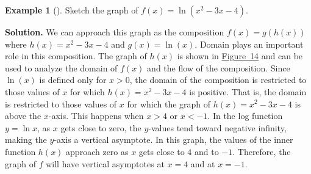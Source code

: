 \documentclass[10pt,]{book}
\theoremstyle{plain}
\theoremstyle{definition}
\theoremstyle{definition}
\newtheorem{example}[theorem]{Example}
\theoremstyle{definition}
\numberwithin{equation}{section}
\newcommand{\lt}{<}
\newcommand{\gt}{>}
\begin{document}
\begin{example}[]\label{example-28}
\hypertarget{p-353}{}%
Sketch the graph of \(f(x) = \ln \left( x^2 - 3x - 4 \right)\).%
\par\smallskip%
\noindent\textbf{Solution.}\hypertarget{solution-28}{}\quad%
\hypertarget{p-354}{}%
We can approach this graph as the composition \(f(x) = g \left( h(x) \right)\) where \(h(x) = x^2 - 3x - 4\) and \(g(x) = \ln (x)\).  Domain plays an important role in this composition. The graph of \(h(x)\) is shown in \hyperref[log-composition-just-quad]{Figure~14} and can be used to analyze the domain of \(f(x)\) and the flow of the composition. Since \(\ln (x)\) is defined only for \(x \gt 0\), the domain of the composition is restricted to those values of \(x\) for which \(h(x) = x^2 -3x - 4\) is positive. That is, the domain is restricted to those values of \(x\) for which the graph of \(h(x) = x^2 -3x -4\) is above the \(x\)-axis. This happens when \(x \gt 4\) or \(x \lt -1\). In the log function \(y = \ln x\), as \(x\) gets close to zero, the \(y\)-values tend toward negative infinity, making the \(y\)-axis a vertical asymptote.  In this graph, the values of the inner function \(h(x)\) approach zero as \(x\) gets close to \(4\) and to \(-1\).  Therefore, the graph of \(f\) will have vertical asymptotes at \(x = 4\) and at \(x = -1\).%
\begin{figure}
\centering
{
}
\end{figure}
\end{example}
\end{document}

